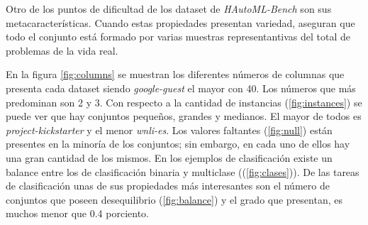 Otro de los puntos de dificultad de los dataset de \textit{HAutoML-Bench} son sus metacaracterísticas. Cuando estas propiedades presentan
variedad, aseguran que todo el conjunto está formado por varias muestras representantivas del total de problemas de la vida real.

En la figura \ref{fig:columns} se muestran los diferentes números de columnas que presenta cada dataset siendo \textit{google-guest} el mayor con 40. 
Los números que más predominan son 2 y 3. 
Con respecto a la cantidad de instancias (\ref{fig:instances}) se puede ver que hay conjuntos pequeños, grandes y medianos.
El mayor de todos es \textit{project-kickstarter} y el menor \textit{wnli-es}.
Los valores faltantes (\ref{fig:null}) están presentes en la minoría de los conjuntos; sin embargo, en cada uno de ellos hay una 
gran cantidad de los mismos. 
En los ejemplos de clasificación existe un balance entre los de clasificación binaria y multiclase ((\ref{fig:clases})). De las tareas de clasificación unas de sus 
propiedades más interesantes son el número de conjuntos que poseen desequilibrio (\ref{fig:balance}) y el grado que presentan, es muchos menor que 0.4 porciento. 


